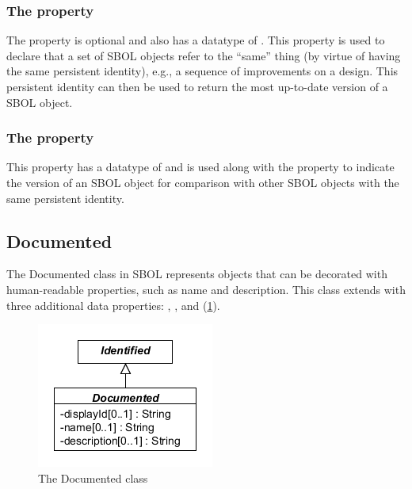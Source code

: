 \subsubsection*{The  property}
\label{sec:persistentIdentity}
The  property is optional and also has a datatype of . This property is used to declare that a set of SBOL objects refer to the ``same'' thing (by virtue of having the same persistent identity), e.g., a sequence of improvements on a design. This persistent identity can then be used to return the most up-to-date version of a SBOL object.



\subsubsection*{The  property}
\label{sec:version}
This property has a datatype of  and is used along with the  property to indicate the version of an SBOL object for comparison with other SBOL objects with the same persistent identity.

\subsection {Documented}
\label{sec:Documented}
The Documented class in SBOL represents objects that can be decorated with human-readable properties, such as name and description. This class extends  with three additional data properties: , , and  (\ref{uml:documented}). 

\begin{figure}[ht]
\begin{center}
\includegraphics[scale=0.6]{uml/documented}
\caption[]{The Documented class}
\label{uml:documented}
\end{center}
\end{figure}

